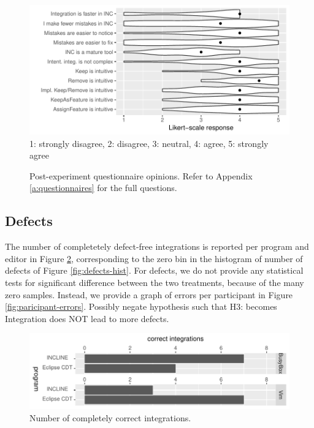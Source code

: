 \begin{figure}[ht]
    \centering
    \includegraphics{figure/incl-exit-quantitative.pdf}
    1: strongly disagree, 2: disagree, 3: neutral, 4: agree, 5: strongly agree
    \caption{Post-experiment questionnaire opinions. Refer to Appendix \ref{a:questionnaires} for the full questions.}
    \label{fig:maturity}
\end{figure}

\subsection{Defects}
The number of completetely defect-free integrations is reported per program and editor in Figure \ref{fig:correct-ans}, corresponding to the zero bin in the histogram of number of defects of Figure \ref{fig:defects-hist}. For defects, we do not provide any statistical tests for significant difference between the two treatments, because of the many zero samples. Instead, we provide a graph of errors per participant in Figure \ref{fig:paricipant-errors}.  Possibly negate hypothesis such that H3: \textit{\HC} becomes \bc Integration does NOT lead to more defects\ec.

\begin{figure}
    \centering
    \includegraphics{figure/incl-correct-ans-r.pdf}
    \caption{Number of completely correct integrations.}
    \label{fig:correct-ans}
\end{figure}

